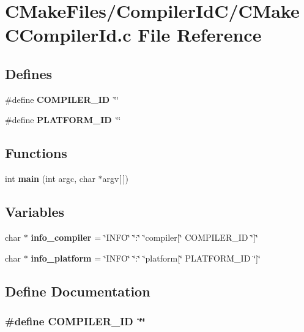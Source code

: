 \section{CMakeFiles/CompilerIdC/CMakeCCompilerId.c File Reference}
\label{CMakeFiles_2CompilerIdC_2CMakeCCompilerId_8c}
\subsection*{Defines}
\begin{DoxyCompactItemize}
\item 
\#define {\bf COMPILER\_\-ID}~\char`\"{}\char`\"{}
\item 
\#define {\bf PLATFORM\_\-ID}~\char`\"{}\char`\"{}
\end{DoxyCompactItemize}
\subsection*{Functions}
\begin{DoxyCompactItemize}
\item 
int {\bf main} (int argc, char $\ast$argv[$\,$])
\end{DoxyCompactItemize}
\subsection*{Variables}
\begin{DoxyCompactItemize}
\item 
char $\ast$ {\bf info\_\-compiler} = \char`\"{}INFO\char`\"{} \char`\"{}:\char`\"{} \char`\"{}compiler[\char`\"{} COMPILER\_\-ID \char`\"{}]\char`\"{}
\item 
char $\ast$ {\bf info\_\-platform} = \char`\"{}INFO\char`\"{} \char`\"{}:\char`\"{} \char`\"{}platform[\char`\"{} PLATFORM\_\-ID \char`\"{}]\char`\"{}
\end{DoxyCompactItemize}


\subsection{Define Documentation}
\subsubsection[{COMPILER\_\-ID}]{\setlength{\rightskip}{0pt plus 5cm}\#define COMPILER\_\-ID~\char`\"{}\char`\"{}}\label{CMakeFiles_2CompilerIdC_2CMakeCCompilerId_8c_a81dee0709ded976b2e0319239f72d174}
